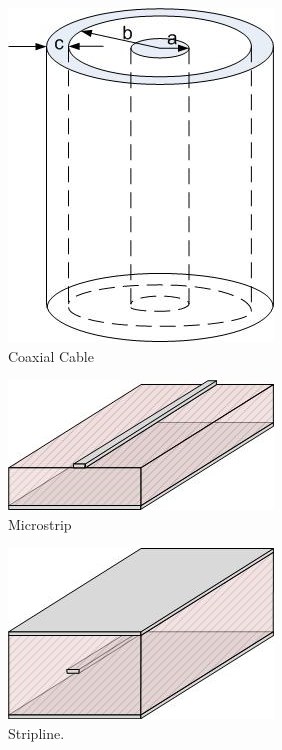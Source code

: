 \documentclass{ximera}
\begin{document}
\begin{figure}[ht!]
\begin{center}
\includegraphics[scale=0.4]{../jpg/coax.jpg}
\caption{\label{fig:qm/Coax} Coaxial Cable}
\end{center}
\end{figure}


\begin{figure}[ht!]
\begin{center}
\includegraphics[scale=0.4]{../jpg/microstrip.jpg}
\caption{\label{fig:qm/MStrip} Microstrip}
\end{center}
\end{figure}

\begin{figure}[ht!]
\begin{center}
\includegraphics[scale=0.4]{../jpg/stripline.jpg}
\caption{\label{fig:qm/Strp} Stripline.}
\end{center}
\end{figure}
\end{document}
